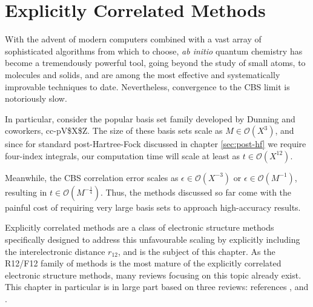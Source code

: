 \chapter{Explicitly Correlated Methods}
\label{chap:explicit}


With the advent of modern computers combined with a vast array of sophisticated algorithms from which to choose, \emph{ab initio} quantum chemistry has become a tremendously powerful tool, going beyond the study of small atoms, to molecules and solids, and are among the most effective and systematically improvable techniques to date. Nevertheless, convergence to the \gls{CBS} limit is notoriously slow.

In particular, consider the popular basis set family developed by Dunning and coworkers, \gls{cc-pV$X$Z}.\cite{dunningGaussian1989a,woonGaussian1993,woonGaussian1994,petersonBenchmark1994,wilsonGaussian1996}
The size of these basis sets scale as $M\in\mathcal{O}(X^3)$, and since for standard post-Hartree-Fock discussed in chapter \ref{sec:post-hf} we require four-index integrals, our computation time will scale at least as $t\in\mathcal{O}(X^{12})$.\cite{klopperR122007}

Meanwhile, the \gls{CBS} correlation error scales as $\epsilon\in\mathcal{O}(X^{-3})$ \cite{helgakerBasisset1997,halkierBasisset1998} or $\epsilon\in\mathcal{O}(M^{-1})$,\cite{klopperInitio1995} resulting in $t\in\mathcal{O}(M^{-\frac 14})$. Thus, the methods discussed so far come with the painful cost of requiring very large basis sets to approach high-accuracy results.

Explicitly correlated methods are a class of electronic structure methods specifically designed to address this unfavourable scaling by explicitly including the interelectronic distance $r_{12}$, and is the subject of this chapter. As the R12/F12 family of methods is the most mature of the explicitly correlated electronic structure methods, many reviews focusing on this topic already exist. This chapter in particular is in large part based on three reviews: references \cite{klopperR122007},  and .


